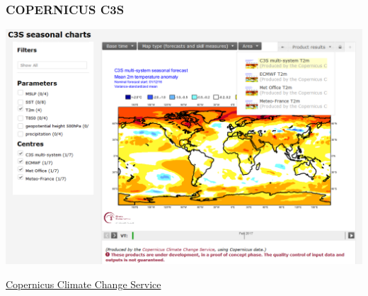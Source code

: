 
\begin{frame}
  \frametitle{COPERNICUS C3S}

 	\includegraphics[width=1\textwidth]{images/NL_150_-_News_11_-_Fig_1.png}

\href{https://climate.copernicus.eu/about-c3s}{Copernicus Climate Change Service}

\end{frame}

